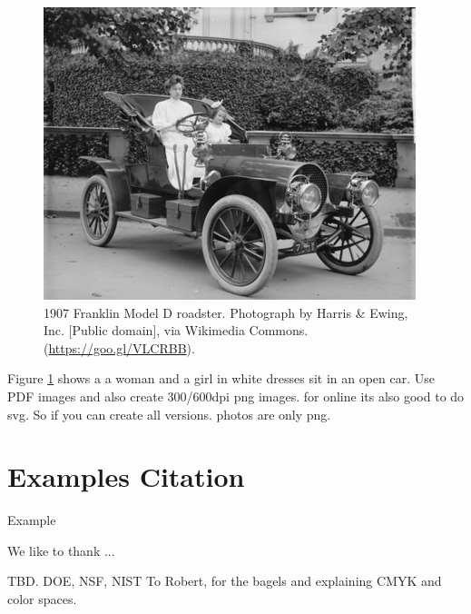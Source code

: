 \documentclass[sigplan,screen,review]{acmart}
\begin{document}
\begin{figure}[h]
  \centering
  \includegraphics[width=1.0\linewidth]{images/sample-franklin.png}
  \caption{1907 Franklin Model D roadster. Photograph by Harris \&
    Ewing, Inc. [Public domain], via Wikimedia
    Commons. (\url{https://goo.gl/VLCRBB}).}
    \label{fig:womman-girl}
\end{figure}

Figure \ref{fig:womman-girl} shows a
a woman and a girl in white dresses sit in an open car. Use PDF images and also create 300/600dpi png images. for online its also good to do svg. So if you can create all versions. photos are only png.

\section{Examples Citation}

Example \cite{cloudmesh-hybrid-workflow}


\begin{acks}

We like to thank ...

TBD. DOE, NSF, NIST
To Robert, for the bagels and explaining CMYK and color spaces.
\end{acks}
\end{document}
